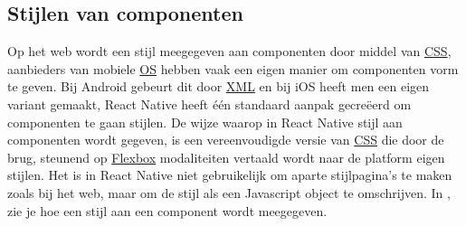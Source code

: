 \subsection{Stijlen van componenten}
Op het web wordt een stijl meegegeven aan componenten door middel van \hyperref[css]{CSS}, aanbieders van mobiele \hyperref[os]{OS} hebben vaak een eigen manier om componenten vorm te geven. Bij Android gebeurt dit door \hyperref[xml]{XML} en bij iOS heeft men een eigen variant gemaakt, React Native heeft één standaard aanpak gecreëerd om componenten te gaan stijlen. De wijze waarop in React Native stijl aan componenten wordt gegeven, is een vereenvoudigde versie van \hyperref[css]{CSS} die door de brug, steunend op \hyperref[flexbox]{Flexbox} modaliteiten vertaald wordt naar de platform eigen stijlen.
Het is in React Native niet gebruikelijk om aparte stijlpagina’s te maken zoals bij het web, maar om de stijl als een Javascript object te omschrijven. In , zie je hoe een stijl aan een component wordt meegegeven.
 
